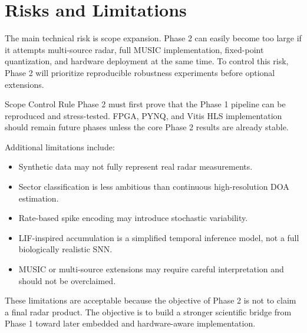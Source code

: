 \section{Risks and Limitations}

The main technical risk is scope expansion. Phase 2 can easily become too large if it attempts multi-source radar, full MUSIC implementation, fixed-point quantization, and hardware deployment at the same time. To control this risk, Phase 2 will prioritize reproducible robustness experiments before optional extensions.

\begin{riskbox}{Scope Control Rule}
Phase 2 must first prove that the Phase 1 pipeline can be reproduced and stress-tested. FPGA, PYNQ, and Vitis HLS implementation should remain future phases unless the core Phase 2 results are already stable.
\end{riskbox}

Additional limitations include:

\begin{itemize}
    \item Synthetic data may not fully represent real radar measurements.
    \item Sector classification is less ambitious than continuous high-resolution DOA estimation.
    \item Rate-based spike encoding may introduce stochastic variability.
    \item LIF-inspired accumulation is a simplified temporal inference model, not a full biologically realistic SNN.
    \item MUSIC or multi-source extensions may require careful interpretation and should not be overclaimed.
\end{itemize}

These limitations are acceptable because the objective of Phase 2 is not to claim a final radar product. The objective is to build a stronger scientific bridge from Phase 1 toward later embedded and hardware-aware implementation.
